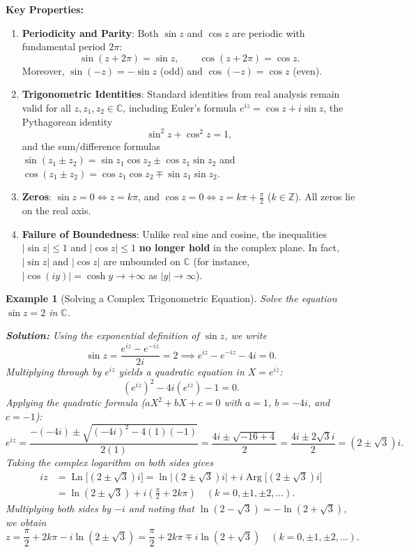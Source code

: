 \documentclass[11pt,a4paper]{article}
\DeclareMathOperator{\Arg}{Arg}
\DeclareMathOperator{\Ln}{Ln}
\theoremstyle{breakdef}
\newtheorem{example}{Example}
\theoremstyle{breakthm}
\begin{document}
\textbf{Key Properties:}
\begin{enumerate}
    \item \textbf{Periodicity and Parity}: Both $\sin z$ and $\cos z$ are periodic with fundamental period $2\pi$:
    \[
        \sin(z + 2\pi) = \sin z, \qquad \cos(z + 2\pi) = \cos z.
    \]
    Moreover, $\sin(-z) = -\sin z$ (odd) and $\cos(-z) = \cos z$ (even).
    \item \textbf{Trigonometric Identities}: Standard identities from real analysis remain valid for all $z, z_1, z_2 \in \mathbb{C}$, including Euler's formula $e^{iz} = \cos z + i\sin z$, the Pythagorean identity
    \[
        \sin^2 z + \cos^2 z = 1,
    \]
    and the sum/difference formulas $\sin(z_1 \pm z_2) = \sin z_1 \cos z_2 \pm \cos z_1 \sin z_2$ and $\cos(z_1 \pm z_2) = \cos z_1 \cos z_2 \mp \sin z_1 \sin z_2$.
    \item \textbf{Zeros}: $\sin z = 0 \iff z = k\pi$, and $\cos z = 0 \iff z = k\pi + \frac{\pi}{2}$ ($k \in \mathbb{Z}$). All zeros lie on the real axis.
    \item \textbf{Failure of Boundedness}: Unlike real sine and cosine, the inequalities $|\sin z| \le 1$ and $|\cos z| \le 1$ \textbf{no longer hold} in the complex plane. In fact, $|\sin z|$ and $|\cos z|$ are unbounded on $\mathbb{C}$ (for instance, $|\cos(iy)| = \cosh y \to +\infty$ as $|y| \to \infty$).
\end{enumerate}

\begin{example}[Solving a Complex Trigonometric Equation]
Solve the equation $\sin z = 2$ in $\mathbb{C}$.

\textbf{Solution:} Using the exponential definition of $\sin z$, we write
\[
    \sin z = \frac{e^{iz} - e^{-iz}}{2i} = 2 \implies e^{iz} - e^{-iz} - 4i = 0.
\]
Multiplying through by $e^{iz}$ yields a quadratic equation in $X = e^{iz}$:
\[
    (e^{iz})^2 - 4i(e^{iz}) - 1 = 0.
\]
Applying the quadratic formula ($aX^2 + bX + c = 0$ with $a = 1$, $b = -4i$, and $c = -1$):
\[
    e^{iz} = \frac{-(-4i) \pm \sqrt{(-4i)^2 - 4(1)(-1)}}{2(1)} = \frac{4i \pm \sqrt{-16 + 4}}{2} = \frac{4i \pm 2\sqrt{3}i}{2} = (2 \pm \sqrt{3})i.
\]
Taking the complex logarithm on both sides gives
\begin{align*}
    iz &= \Ln\bigl[(2 \pm \sqrt{3})i\bigr] = \ln\bigl|(2 \pm \sqrt{3})i\bigr| + i\Arg\bigl[(2 \pm \sqrt{3})i\bigr] \\
       &= \ln(2 \pm \sqrt{3}) + i\left(\frac{\pi}{2} + 2k\pi\right) \quad (k = 0, \pm 1, \pm 2, \dots).
\end{align*}
Multiplying both sides by $-i$ and noting that $\ln(2 - \sqrt{3}) = -\ln(2 + \sqrt{3})$, we obtain
\[
    z = \frac{\pi}{2} + 2k\pi - i\ln(2 \pm \sqrt{3}) = \frac{\pi}{2} + 2k\pi \mp i\ln(2 + \sqrt{3}) \quad (k = 0, \pm 1, \pm 2, \dots).
\]
\end{example}
\end{document}
